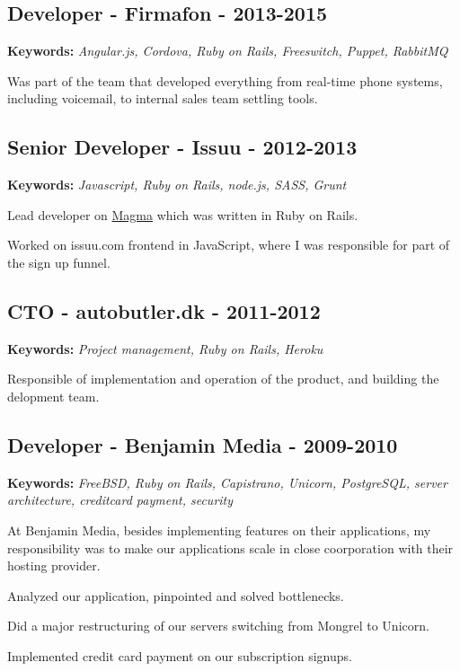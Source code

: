 \documentclass[a4paper]{article}
\renewenvironment{itemize}{
  \begin{list}{}
    { \setlength{\itemsep}{5pt}
      \setlength{\parsep}{0pt}
      \setlength{\topsep}{0pt}
      \setlength{\leftmargin}{0em} } }{
  \end{list}}
\newcommand{\keywords}[1]{\small\textbf{Keywords:} \emph{#1}\normalsize}
\begin{document}
\subsection*{Developer - Firmafon - 2013-2015}
\keywords{Angular.js, Cordova, Ruby on Rails, Freeswitch, Puppet, RabbitMQ}

Was part of the team that developed everything from real-time phone systems, including voicemail, to internal sales team settling tools.

\subsection*{Senior Developer - Issuu - 2012-2013}
\keywords{Javascript, Ruby on Rails, node.js, SASS, Grunt}

Lead developer on \href{http://www.magmahq.com}{Magma} which was written in Ruby on Rails.

Worked on issuu.com frontend in JavaScript, where I was responsible for part of the sign up funnel.

\subsection*{CTO - autobutler.dk - 2011-2012}
\keywords{Project management, Ruby on Rails, Heroku}

Responsible of implementation and operation of the product, and building the delopment team.

\subsection*{Developer - Benjamin Media - 2009-2010}
\keywords{FreeBSD, Ruby on Rails, Capistrano, Unicorn, PostgreSQL, server architecture, creditcard payment, security}

At Benjamin Media, besides implementing features on their applications, my responsibility was to make our applications scale in close coorporation with their hosting provider.

\begin{itemize}
  \item Analyzed our application, pinpointed and solved bottlenecks.
  \item Did a major restructuring of our servers switching from Mongrel to Unicorn.
  \item Implemented credit card payment on our subscription signups.
\end{itemize}
\end{document}

